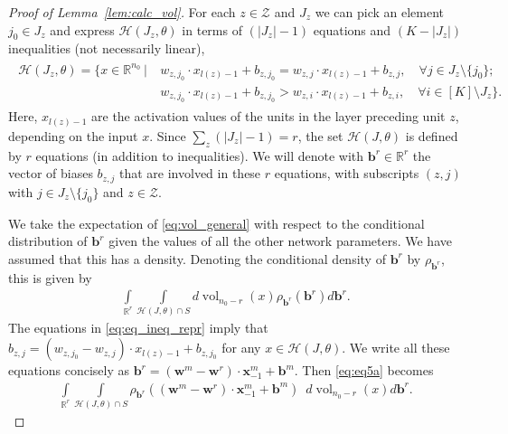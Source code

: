 \documentclass{article}
\theoremstyle{definition}
\newcommand{\nin}{n_0}
\newcommand{\vol}{\operatorname{vol}}
\begin{document}
\begin{proof}[Proof of Lemma~\ref{lem:calc_vol}]
    For each $z\in\mathcal{Z}$ and $J_z$ we can pick an element $j_0\in J_z$ and express $\mathcal{H}(J_z,\theta)$ in terms of $(|J_z| - 1)$ equations and $(K - |J_z|)$ inequalities (not necessarily linear), 
    \begin{align}
        \begin{split}
            \mathcal{H}(J_z,\theta) =  \{x \in \mathbb{R}^{\nin} \ | \ &w_{z, j_0} \cdot x_{l(z)-1} + b_{z, j_0} = w_{z, j} \cdot x_{l(z)-1} + b_{z, j}, \quad \forall j \in J_z \setminus \{j_0\};\\
            &w_{z, j_0} \cdot x_{l(z)-1} + b_{z, j_0} > w_{z, i} \cdot x_{l(z)-1} + b_{z, i}, \quad \forall i \in [K] \setminus J_z \}. 
        \end{split}
        \label{eq:eq_ineq_repr}
    \end{align}
    Here, $x_{l(z)-1}$ are the activation values of the units in the layer preceding unit $z$, depending on the input $x$. 
    Since $\sum_{z} (|J_z|-1) = r$, the set $\mathcal{H}(J,\theta)$ is defined by $r$ equations (in addition to inequalities). 
    We will denote with $\mathbf{b}^r \in \mathbb{R}^{r}$ the vector of biases $b_{z, j}$ that are involved in these $r$ equations, with subscripts $(z,j)$ with $j\in J_z\setminus \{j_0\}$ and $z\in\mathcal{Z}$. 
    
    We take the expectation of \eqref{eq:vol_general} with respect to the conditional distribution of $\mathbf{b}^r$ given the values of all the other network parameters. 
    We have assumed that this has a density. 
    Denoting the conditional density of $\mathbf{b}^r$ by $\rho_{\mathbf{b}^r}$, this is given by 
    \begin{align}
        \int\limits_{\mathbb{R}^r}
        \int\limits_{\mathcal{H}(J,\theta) \cap S } d\vol_{\nin - r}(x)
        \rho_{\mathbf{b}^r}(\mathbf{b}^r) 
        d\mathbf{b}^r .
        \label{eq:eq5a}
    \end{align}
    The equations in \eqref{eq:eq_ineq_repr} imply that $b_{z, j} = (w_{z, j_0} - w_{z, j}) \cdot x_{l(z)-1} + b_{z, j_0}$ for any $x\in \mathcal{H}(J,\theta)$. 
    We write all these equations concisely as $\mathbf{b}^r = (\mathbf{w}^m - \mathbf{w}^r) \cdot \mathbf{x}^m_{-1} + \mathbf{b}^m$. 
    Then \eqref{eq:eq5a} becomes 
    \begin{align}
        \int\limits_{\mathbb{R}^r} \int\limits_{\mathcal{H}(J,\theta) \cap S } \rho_{\mathbf{b}^r}((\mathbf{w}^m - \mathbf{w}^r) \cdot \mathbf{x}^m_{-1} + \mathbf{b}^m) \enspace d\vol_{\nin - r}(x) d\mathbf{b}^r.
        \label{eq:eq5}
    \end{align}
    

\end{proof}
\end{document}
